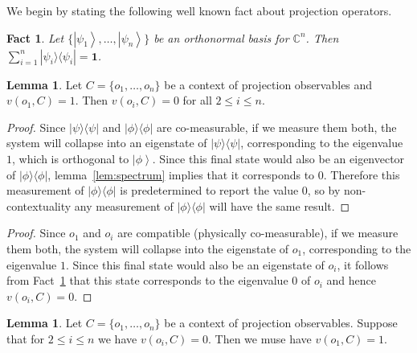 \documentclass[11pt, a4paper]{article}
\newtheorem{Fact}[Theorem]{Fact}
\theoremstyle{definition}
\newtheorem{lemma}[Theorem]{Lemma}
\newcommand{\ket}[1]{\left| #1 \right>}
\newcommand{\iprod}[2]{\langle #1 | #2 \rangle}
\newcommand{\oprod}[2]{| #1 \rangle\langle #2 |}
\begin{document}
We begin by stating the following well known fact about projection operators.\\
\begin{Fact}\label{fact:completeness}
	Let $\{\ket{\psi_1},\dots,\ket{\psi_n}\}$ be an orthonormal basis for $\mathbb{C}^n$. Then $\sum_{i=1}^n \oprod{\psi_i}{\psi_i}=\mathbf{1}$.\\
\end{Fact}

\begin{lemma}
\label{lem:yes to no}
Let $C=\{o_1,\dots,o_n\}$ be a context of projection observables and $v(o_1,C)=1$. Then $v(o_i,C)=0$ for all $2\le i \le n$.
\end{lemma}
\begin{proof}
Since $\oprod{\psi}{\psi}$ and $\oprod{\phi}{\phi}$ are co-measurable, if we measure them both, the system will collapse into an eigenstate of $\oprod{\psi}{\psi}$, corresponding to the eigenvalue $1$, which is orthogonal to $\ket{\phi}$.
Since this final state would also be an eigenvector of $\oprod{\phi}{\phi}$, lemma~\ref{lem:spectrum} implies that it corresponds to $0$.
Therefore this measurement of $\oprod{\phi}{\phi}$ is predetermined to report the value $0$, so by non-contextuality any measurement of $\oprod{\phi}{\phi}$ will have the same result.
\end{proof}
\fi
\begin{proof}
Since $o_1$ and $o_i$ are compatible (physically co-measurable), if we measure them both, the system will collapse into the eigenstate of $o_1$, corresponding to the eigenvalue $1$.
Since this final state would also be an eigenstate of $o_i$, it follows from Fact~\ref{fact:completeness} that this state corresponds to the eigenvalue 0 of $o_i$ and hence $v(o_i,C)=0$.
\end{proof}
\begin{lemma}
\label{lem:no to yes}
Let $C=\{o_1,\dots,o_n\}$ be a context of projection observables. Suppose that for $2\le i \le n$ we have $v(o_i,C)=0$. Then we muse have $v(o_1,C)=1$.
\end{lemma}
\end{document}
